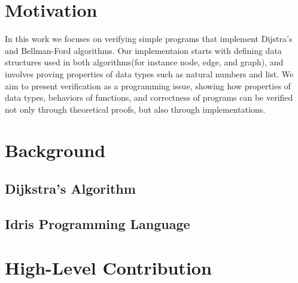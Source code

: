 \documentclass[11pt, a4paper]{article} %
\theoremstyle{definition}
\begin{document}


\section{Motivation}



In this work we focuses on verifying simple programs that implement Dijstra's and Bellman-Ford algorithms. Our implementaion starts with defining data structures used in both algorithms(for instance node, edge, and graph), and involves proving properties of data types such as natural numbers and list. We aim to present verification as a programming issue, showing how properties of data types, behaviors of functions, and correctness of programs can be verified not only through theoretical proofs, but also through implementations.

\section{Background}
\subsection{Dijkstra's Algorithm}
\subsection{Idris Programming Language}


\section{High-Level Contribution}
\end{document}
